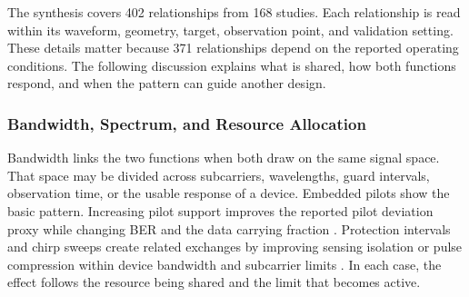 The synthesis covers 402 relationships from 168 studies. Each relationship is
read within its waveform, geometry, target, observation point, and validation
setting. These details matter because 371 relationships depend on the reported
operating conditions. The following discussion explains what is shared, how
both functions respond, and when the pattern can guide another design.


\subsubsection{Bandwidth, Spectrum, and Resource Allocation}

Bandwidth links the two functions when both draw on the same signal space. That
space may be divided across subcarriers, wavelengths, guard intervals,
observation time, or the usable response of a device. Embedded pilots show the
basic pattern. Increasing pilot support improves the reported pilot deviation
proxy while changing BER and the data carrying fraction
\cite{OISAC_SCR00007}. Protection intervals and chirp sweeps create related
exchanges by improving sensing isolation or pulse compression within device
bandwidth and subcarrier limits
\cite{OISAC_SCR00344,OISAC_SCR00366}. In each case, the effect follows the
resource being shared and the limit that becomes active.

